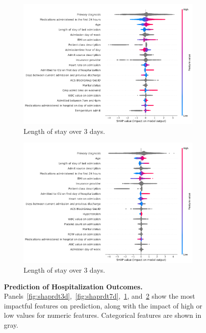 \begin{figure}
\begin{adjustbox}{minipage=1.0\linewidth,frame}
\begin{subfigure}[t]{.45\linewidth}
    \centering
    \captionsetup[subfigure]{}
    \caption{Length of stay over 3 days.}\label{fig:shaplos3d}
    \includegraphics[width=\linewidth,keepaspectratio]{supplementary/los3d_SHAP_summary.pdf}
\end{subfigure}%
\begin{subfigure}[t]{.45\linewidth}
    \centering
    \captionsetup[subfigure]{}
    \caption{Length of stay over 3 days.}\label{fig:shaplos7d}
    \includegraphics[width=\linewidth,keepaspectratio]{supplementary/los7d_SHAP_summary.pdf}
\end{subfigure}%

\caption{\textbf{Prediction of Hospitalization Outcomes.} \\
Panels~\ref{fig:shaprdt3d},~\ref{fig:shaprdt7d},~\ref{fig:shaplos3d}, and~\ref{fig:shaplos7d} 
show the most impactful features on prediction, 
along with the impact of high or low values for numeric features. Categorical features are shown in gray.\@
}\label{fig:suppshapfig}
\end{adjustbox}
\end{figure}